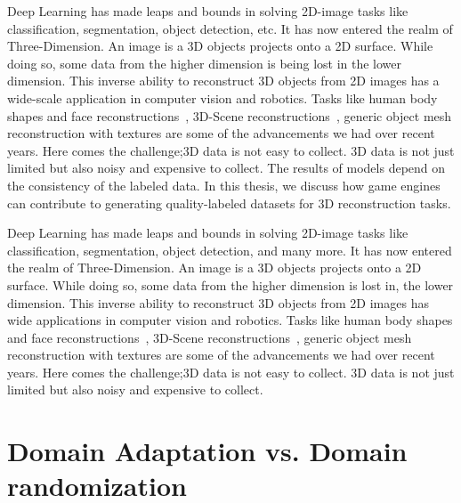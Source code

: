 Deep Learning has made leaps and bounds in solving 2D-image tasks like classification, segmentation, object detection, etc.
It has now entered the realm of Three-Dimension.
An image is a 3D objects projects onto a 2D surface.
While doing so, some data from the higher dimension is being lost in the lower dimension.
This inverse ability to reconstruct 3D objects from 2D images has a wide-scale application in computer vision and robotics.
Tasks like human body shapes and face reconstructions~\cite{deng2019accurate,Guo20173DFaceNetRD,9210569,richardson20163d,Richardson2017LearningDF},
3D-Scene reconstructions~\cite{Denninger20203DSR,Song2017SemanticSC,LiSilhouetteAssisted3O,Shin20193DSR}, generic object mesh reconstruction with textures are some of the advancements we had over recent years.
Here comes the challenge;3D data is not easy to collect.
3D data is not just limited but also noisy and expensive to collect.
The results of models depend on the consistency of the labeled data.
In this thesis, we discuss how game engines can contribute to generating quality-labeled datasets for 3D reconstruction tasks.


Deep Learning has made leaps and bounds in solving 2D-image tasks like classification, segmentation, object detection, and many more.
It has now entered the realm of Three-Dimension.
An image is a 3D objects projects onto a 2D surface.
While doing so, some data from the higher dimension is lost in, the lower dimension.
This inverse ability to reconstruct 3D objects from 2D images has wide applications in computer vision and robotics.
Tasks like human body shapes and face reconstructions~\cite{deng2019accurate,Guo20173DFaceNetRD,9210569,richardson20163d,Richardson2017LearningDF},
3D-Scene reconstructions~\cite{Denninger20203DSR,Song2017SemanticSC,LiSilhouetteAssisted3O,Shin20193DSR},
generic object mesh reconstruction with textures are some of the advancements we had over recent years.
Here comes the challenge;3D data is not easy to collect.
3D data is not just limited but also noisy and expensive to collect.

\section{Domain Adaptation vs. Domain randomization} \label{sec:da vs dr}

